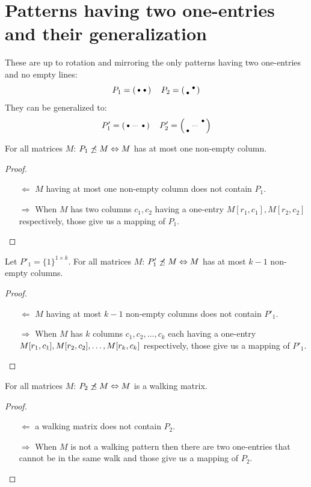 \section{Patterns having two one-entries and their generalization}
\label{sec:2ones}
These are up to rotation and mirroring the only patterns having two one-entries and no empty lines:
$$P_1=\left(\begin{smallmatrix}\bullet&\bullet\end{smallmatrix}\right)\ \ \ P_2=\left(\begin{smallmatrix} &\bullet\\\bullet& \end{smallmatrix}\right)$$
They can be generalized to:
$$P'_1=\smm{\bullet&\cdots&\bullet}\ \ \ P'_2=\smm{ & &\bullet\\ &\cdots& \\\bullet& & }$$

\begin{thm}
For all matrices $M$: $P_1\not\preceq M\Leftrightarrow M$ has at most one non-empty column.
\end{thm}
\begin{proof}
\begin{itemize}
	\item[$\Leftarrow$] $M$ having at most one non-empty column does not contain $P_1$.
	\item[$\Rightarrow$] When $M$ has two columns $c_1,c_2$ having a one-entry $M[r_1,c_1],M[r_2,c_2]$ respectively, those give us a mapping of $P_1$.
\end{itemize}
\end{proof}

\begin{thm}
Let $P'_1=\{1\}^{1\times k}$. For all matrices $M$: $P'_1\not\preceq M\Leftrightarrow M$ has at most $k-1$ non-empty columns.
\end{thm}
\begin{proof}
\begin{itemize}
	\item[$\Leftarrow$] $M$ having at most $k-1$ non-empty columns does not contain $P'_1$.
	\item[$\Rightarrow$] When $M$ has $k$ columns $c_1,c_2,\dots,c_k$ each having a one-entry $M[r_1,c_1],\\M[r_2,c_2],\dots,M[r_k,c_k]$ respectively, those give us a mapping of $P'_1$.
\end{itemize}
\end{proof}

\begin{thm}
\label{thm:walking}
For all matrices $M$: $P_2\not\preceq M\Leftrightarrow M$ is a walking matrix.
\end{thm}
\begin{proof}
\begin{itemize}
	\item[$\Leftarrow$] a walking matrix does not contain $P_2$.
	\item[$\Rightarrow$] When $M$ is not a walking pattern then there are two one-entries that cannot be in the same walk and those give us a mapping of $P_2$.
\end{itemize}
\end{proof}

